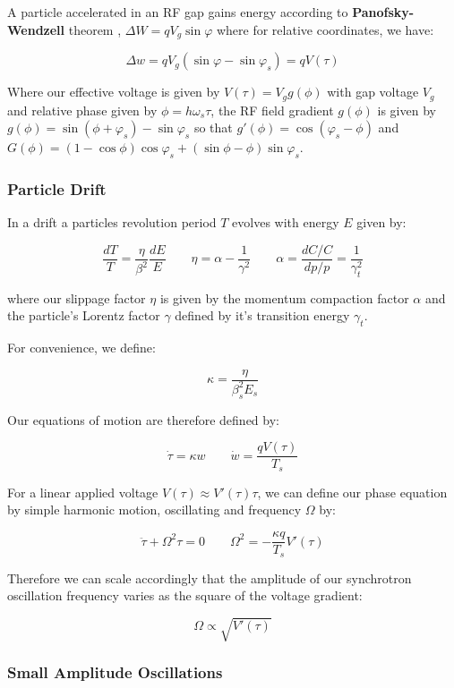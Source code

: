 A particle accelerated in an RF gap gains energy according to \textbf{Panofsky-Wendzell} theorem , $\Delta W=qV_g\sin\varphi$ where for relative coordinates, we have:

$$\Delta w = q V_g(\sin\varphi-\sin\varphi_s)=q V(\tau)$$

Where our effective voltage is given by $V(\tau) = V_g g(\phi)$ with gap voltage $V_g$ and relative phase given by $\phi = h\omega_s\tau$, the RF field gradient $g(\phi)$ is given by $g(\phi)=\sin(\phi+\varphi_s)-\sin\varphi_s$ so that $g'(\phi)=\cos(\varphi_s-\phi)$ and $G(\phi)=(1-\cos\phi)\cos\varphi_s+(\sin\phi-\phi)\sin\varphi_s$.

\subsubsection{Particle Drift}

In a drift a particles revolution period $T$ evolves with energy $E$ given by:

$$\frac{dT}{T} = \frac{\eta}{\beta^2}\frac{dE}{E} \qquad \eta =\alpha- \frac{1}{\gamma^2} \qquad \alpha = \frac{dC/C}{dp/p} = \frac{1}{\gamma_t^2}$$

where our slippage factor $\eta$ is given by the momentum compaction factor $\alpha$ and the particle's Lorentz factor $\gamma$ defined by it's transition energy $\gamma_t$.

For convenience, we define:

$$\kappa = \frac{\eta}{\beta_s^2E_s} $$

Our equations of motion are therefore defined by:

\begin{equation}
    \dot{\tau} = \kappa w \qquad \dot{w} = \frac{qV(\tau)}{T_s}
    \label{eq:eom}
\end{equation}

For a linear applied voltage $V(\tau) \approx V'(\tau)\tau$, we can define our phase equation by simple harmonic motion, oscillating and frequency $\Omega$ by:

$$\ddot{\tau}+\Omega^2\tau = 0 \qquad \Omega^2 = -\frac{\kappa q}{T_s}V'(\tau)$$

Therefore we can scale accordingly that the amplitude of our synchrotron oscillation frequency varies as the square of the voltage gradient:

$$\Omega \propto \sqrt{V'(\tau)}$$

\subsubsection{Small Amplitude Oscillations}

